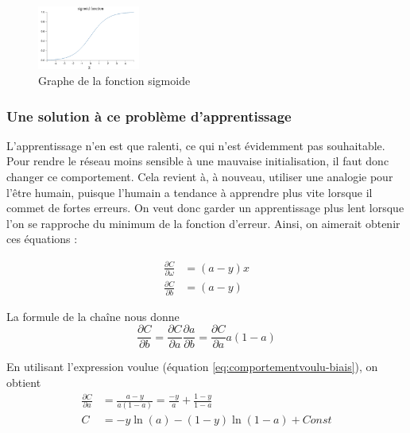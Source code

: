 \begin{figure}[h]
 \centering
 \includegraphics[width=0.3\textwidth]{img/sigmoid_function.png}
 \caption{Graphe de la fonction sigmoide}
 \label{fig:sigmoid_function}
\end{figure}

\subsubsection{Une solution à ce problème d'apprentissage}
\label{subsubsection:etablissement-eq-entropiecroisee}

L'apprentissage n'en est que ralenti, ce qui n'est évidemment pas souhaitable. Pour rendre le réseau moins sensible à une mauvaise initialisation,
il faut donc changer ce comportement. Cela revient à, à nouveau, utiliser une analogie pour l'être humain, puisque l'humain a tendance à apprendre
plus vite lorsque il commet de fortes erreurs. On veut donc garder un apprentissage plus lent lorsque l'on se rapproche du minimum de la fonction
d'erreur. Ainsi, on aimerait obtenir ces équations :

\begin{align}
  \label{eq:comportementvoulu-poids}
  \frac{\partial C}{\partial \omega} &= \left(a-y\right)x \\
  \frac{\partial C}{\partial b} &= \left(a-y\right)
  \label{eq:comportementvoulu-biais}
\end{align}

La formule de la chaîne nous donne 
\begin{equation}
 \frac{\partial C}{\partial b} = \frac{\partial C}{\partial a} \frac{\partial a}{\partial b} = \frac{\partial C}{\partial a} a\left(1-a\right)
\end{equation}

En utilisant l'expression voulue (équation \ref{eq:comportementvoulu-biais}), on obtient 
\begin{align}
 \frac{\partial C}{\partial a} &= \frac{a-y}{a\left(1-a\right)} = \frac{-y}{a} + \frac{1-y}{1-a} \\
 C &= -y\ln\left(a\right) - \left(1-y\right)\ln\left(1-a\right) + Const
\end{align}

